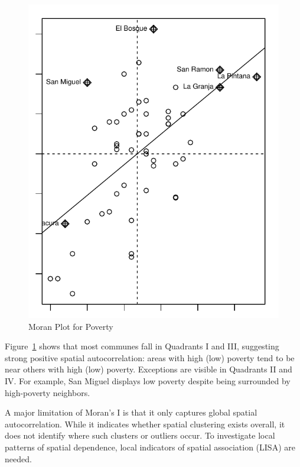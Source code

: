 \begin{figure}[ht]
\caption{Moran Plot for Poverty}\label{fig:mp-poverty}
\begin{knitrout}
\color{fgcolor}

{\centering \includegraphics[width=\maxwidth]{figure/moran-plotT-1} 

}


\end{knitrout}
\end{figure}

Figure~\ref{fig:mp-poverty} shows that most communes fall in Quadrants I and III, suggesting strong positive spatial autocorrelation: areas with high (low) poverty tend to be near others with high (low) poverty. Exceptions are visible in Quadrants II and IV. For example, San Miguel displays low poverty despite being surrounded by high-poverty neighbors.

A major limitation of Moran’s I is that it only captures global spatial autocorrelation. While it indicates whether spatial clustering exists overall, it does not identify where such clusters or outliers occur. To investigate local patterns of spatial dependence, local indicators of spatial association (LISA) are needed.

